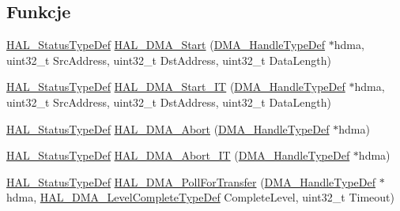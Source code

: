 \subsection*{Funkcje}
\begin{DoxyCompactItemize}
\item 
\hyperlink{stm32f4xx__hal__def_8h_a63c0679d1cb8b8c684fbb0632743478f}{H\+A\+L\+\_\+\+Status\+Type\+Def} \hyperlink{group___d_m_a___exported___functions___group2_ga96fbd9c285135f558fd9283a57406330}{H\+A\+L\+\_\+\+D\+M\+A\+\_\+\+Start} (\hyperlink{group___d_m_a___exported___types_ga41b754a906b86bce54dc79938970138b}{D\+M\+A\+\_\+\+Handle\+Type\+Def} $\ast$hdma, uint32\+\_\+t Src\+Address, uint32\+\_\+t Dst\+Address, uint32\+\_\+t Data\+Length)
\item 
\hyperlink{stm32f4xx__hal__def_8h_a63c0679d1cb8b8c684fbb0632743478f}{H\+A\+L\+\_\+\+Status\+Type\+Def} \hyperlink{group___d_m_a___exported___functions___group2_ga7eddc0931ac8a3d77b23d6d5e68407c7}{H\+A\+L\+\_\+\+D\+M\+A\+\_\+\+Start\+\_\+\+IT} (\hyperlink{group___d_m_a___exported___types_ga41b754a906b86bce54dc79938970138b}{D\+M\+A\+\_\+\+Handle\+Type\+Def} $\ast$hdma, uint32\+\_\+t Src\+Address, uint32\+\_\+t Dst\+Address, uint32\+\_\+t Data\+Length)
\item 
\hyperlink{stm32f4xx__hal__def_8h_a63c0679d1cb8b8c684fbb0632743478f}{H\+A\+L\+\_\+\+Status\+Type\+Def} \hyperlink{group___d_m_a___exported___functions___group2_ga001f9fb04328a7460f9ff16908ff987c}{H\+A\+L\+\_\+\+D\+M\+A\+\_\+\+Abort} (\hyperlink{group___d_m_a___exported___types_ga41b754a906b86bce54dc79938970138b}{D\+M\+A\+\_\+\+Handle\+Type\+Def} $\ast$hdma)
\item 
\hyperlink{stm32f4xx__hal__def_8h_a63c0679d1cb8b8c684fbb0632743478f}{H\+A\+L\+\_\+\+Status\+Type\+Def} \hyperlink{group___d_m_a___exported___functions___group2_ga6677d7e614747341a58ffd7a048fd390}{H\+A\+L\+\_\+\+D\+M\+A\+\_\+\+Abort\+\_\+\+IT} (\hyperlink{group___d_m_a___exported___types_ga41b754a906b86bce54dc79938970138b}{D\+M\+A\+\_\+\+Handle\+Type\+Def} $\ast$hdma)
\item 
\hyperlink{stm32f4xx__hal__def_8h_a63c0679d1cb8b8c684fbb0632743478f}{H\+A\+L\+\_\+\+Status\+Type\+Def} \hyperlink{group___d_m_a___exported___functions___group2_ga976a30472df973e3ad983f21289c9b5d}{H\+A\+L\+\_\+\+D\+M\+A\+\_\+\+Poll\+For\+Transfer} (\hyperlink{group___d_m_a___exported___types_ga41b754a906b86bce54dc79938970138b}{D\+M\+A\+\_\+\+Handle\+Type\+Def} $\ast$hdma, \hyperlink{group___d_m_a___exported___types_gaee3245eea8fa938edeb35a6c9596fd86}{H\+A\+L\+\_\+\+D\+M\+A\+\_\+\+Level\+Complete\+Type\+Def} Complete\+Level, uint32\+\_\+t Timeout)

\end{DoxyCompactItemize}
